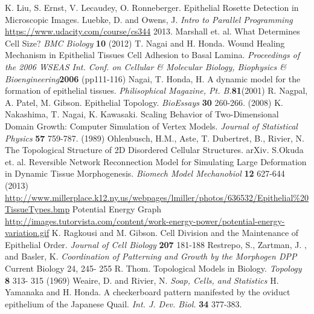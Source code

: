 \begin{thebibliography}{1}
 K. Liu, S. Ernst, V. Lecaudey, O. Ronneberger. Epithelial Rosette Detection in Microscopic Images.
 Luebke, D. and Owens, J. \emph{Intro to Parallel Programming} \url{https://www.udacity.com/course/cs344} 2013.
 Marshall et. al. What Determines Cell Size? \emph{BMC Biology} \textbf{10} (2012)
 T. Nagai and H. Honda. Wound Healing Mechanism in Epithelial Tissues Cell Adhesion to Basal Lamina. \emph{Proceedings of the 2006 WSEAS Int. Conf. on Cellular \& Molecular Biology, Biophysics \& Bioengineering}\textbf{2006} (pp111-116)
 Nagai, T. Honda, H. A dynamic model for the formation of epithelial tissues. \emph{Philisophical Magazine, Pt. B.}\textbf{81}(2001) 
 R. Nagpal, A. Patel, M. Gibson. Epithelial Topology. \emph{BioEssays} \textbf{30} 260-266. (2008)
 K. Nakashima, T. Nagai, K. Kawasaki. Scaling Behavior of Two-Dimensional  Domain Growth: Computer Simulation of Vertex Models. \emph{Journal of Statistical Physics} \textbf{57} 759-787. (1989)
 Ohlenbusch, H.M., Aste, T. Dubertret, B., Rivier, N. The Topological Structure of 2D Disordered Cellular Structures. arXiv.
 S.Okuda et. al. Reversible Network Reconnection Model for Simulating Large Deformation in Dynamic Tissue Morphogenesis. \emph{Biomech Model Mechanobiol} \textbf{12} 627-644 (2013)
 \url{http://www.millerplace.k12.ny.us/webpages/lmiller/photos/636532/Epithelial\%20TissueTypes.bmp}
 Potential Energy Graph \url{http://images.tutorvista.com/content/work-energy-power/potential-energy-variation.gif}
 K. Ragkousi and M. Gibson. Cell Division and the Maintenance of Epithelial Order. \emph{Journal of Cell Biology} \textbf{207} 181-188
 Restrepo, S., Zartman, J. , and Basler, K. \emph{ Coordination of Patterning and Growth by the Morphogen DPP} Current Biology 24, 245- 255
 R. Thom. Topological Models in Biology. \emph{Topology} \textbf{8} 313- 315 (1969)
 Weaire, D. and Rivier, N. \emph{Soap, Cells, and Statistics}
 H. Yamanaka and H. Honda. A checkerboard pattern manifested by the oviduct epithelium of the Japanese Quail. \emph{Int. J. Dev. Biol.} \textbf{34} 377-383.
\end{thebibliography}


